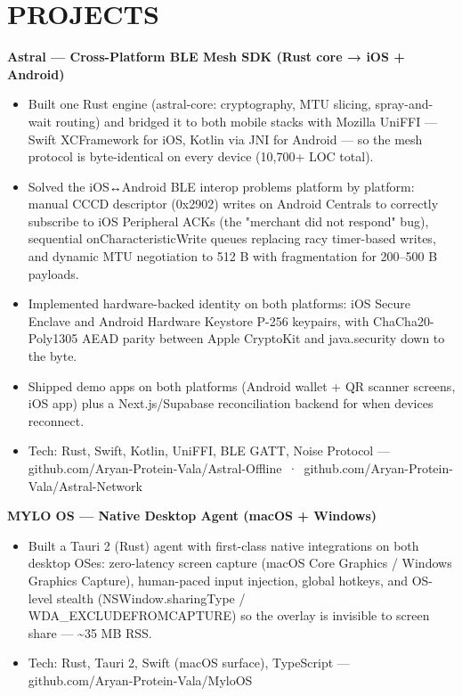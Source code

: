 \documentclass[9pt]{article}
\begin{document}
\section*{PROJECTS}
\textbf{Astral  ---  Cross-Platform BLE Mesh SDK (Rust core → iOS + Android)}
\vspace{1pt}
\begin{itemize}[leftmargin=11pt,itemsep=0pt,topsep=1pt,parsep=0pt]
\item Built one Rust engine (astral-core: cryptography, MTU slicing, spray-and-wait routing) and bridged it to both mobile stacks with Mozilla UniFFI  ---  Swift XCFramework for iOS, Kotlin via JNI for Android  ---  so the mesh protocol is byte-identical on every device (10,700+ LOC total).
\item Solved the iOS↔Android BLE interop problems platform by platform: manual CCCD descriptor (0x2902) writes on Android Centrals to correctly subscribe to iOS Peripheral ACKs (the "merchant did not respond" bug), sequential onCharacteristicWrite queues replacing racy timer-based writes, and dynamic MTU negotiation to 512 B with fragmentation for 200–500 B payloads.
\item Implemented hardware-backed identity on both platforms: iOS Secure Enclave and Android Hardware Keystore P-256 keypairs, with ChaCha20-Poly1305 AEAD parity between Apple CryptoKit and java.security down to the byte.
\item Shipped demo apps on both platforms (Android wallet + QR scanner screens, iOS app) plus a Next.js/Supabase reconciliation backend for when devices reconnect.
\item Tech: Rust, Swift, Kotlin, UniFFI, BLE GATT, Noise Protocol  ---  github.com/Aryan-Protein-Vala/Astral-Offline \,·\, github.com/Aryan-Protein-Vala/Astral-Network
\end{itemize}
\textbf{MYLO OS  ---  Native Desktop Agent (macOS + Windows)}
\vspace{1pt}
\begin{itemize}[leftmargin=11pt,itemsep=0pt,topsep=1pt,parsep=0pt]
\item Built a Tauri 2 (Rust) agent with first-class native integrations on both desktop OSes: zero-latency screen capture (macOS Core Graphics / Windows Graphics Capture), human-paced input injection, global hotkeys, and OS-level stealth (NSWindow.sharingType / WDA\_EXCLUDEFROMCAPTURE) so the overlay is invisible to screen share  ---  \textasciitilde{}35 MB RSS.
\item Tech: Rust, Tauri 2, Swift (macOS surface), TypeScript  ---  github.com/Aryan-Protein-Vala/MyloOS
\end{itemize}
\end{document}
